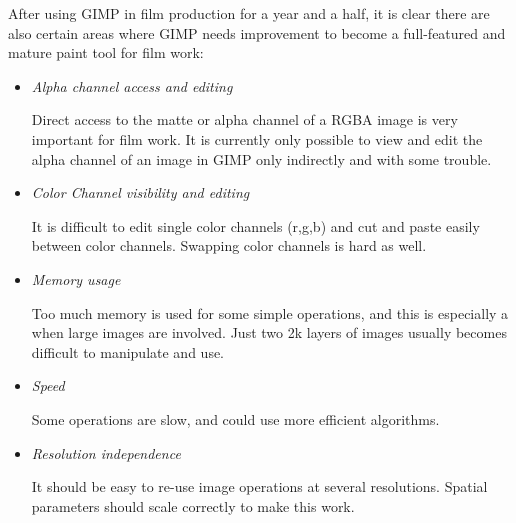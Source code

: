 After using GIMP in film production for a year and a half, it is clear there
are also certain areas where GIMP needs improvement to become a full-featured
and mature paint tool for film work:
\begin{itemize}

\item {\em Alpha channel access and editing}

Direct access to the matte or alpha channel of a RGBA image is very important
for film work. It is currently only possible to view and edit the alpha channel
of an image in GIMP only indirectly and with some trouble.  

\item {\em Color Channel visibility and editing}

It is difficult to edit single color channels (r,g,b) and cut and paste easily
between color channels. Swapping color channels is hard as well.

\item {\em Memory usage}

Too much memory is used for some simple operations, and this is especially 
a when large images are involved. Just two 2k layers of images usually becomes
difficult to manipulate and use.

\item {\em Speed}

Some operations are slow, and could use more efficient algorithms.

\item {\em Resolution independence} 

It should be easy to re-use image operations at several resolutions. Spatial
parameters should scale correctly to make this work.
\end{itemize}

